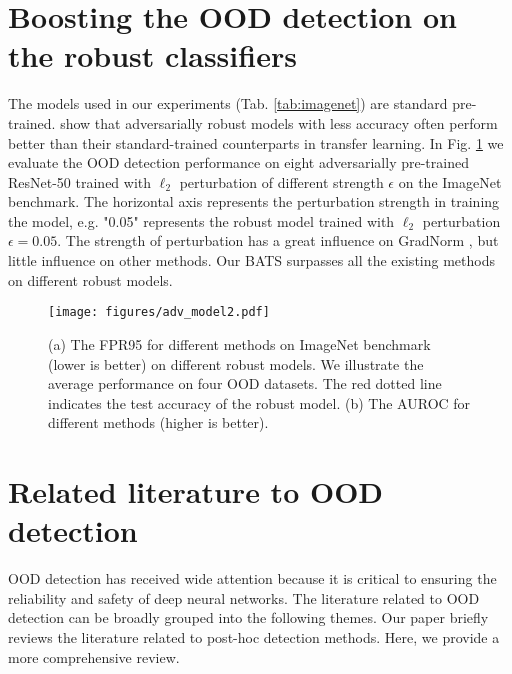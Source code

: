\documentclass{article}
\begin{document}
\section{Boosting the OOD detection on the robust classifiers}\label{App:Robust}
 The models used in our experiments (Tab. \ref{tab:imagenet}) are standard pre-trained. \citet{salman2020adversariallytrans} show that adversarially robust models with less accuracy often perform better than their standard-trained counterparts in transfer learning.
 In Fig. \ref{img:advmodel} we evaluate the OOD detection performance on eight adversarially pre-trained ResNet-50 trained with $\ell_{2}$ perturbation of different strength $\epsilon$ \cite{salman2020adversariallytrans} on the ImageNet benchmark. The horizontal axis represents the perturbation strength in training the model, e.g. "0.05" represents the robust model trained with $\ell_{2}$ perturbation $\epsilon=0.05$. The strength of perturbation has a great influence on GradNorm \cite{huang2021importance}, but little influence on other methods. Our BATS surpasses all the existing methods on different robust models.
 
 \begin{figure}[htbp]
\centering
\texttt{[image: figures/adv\_model2.pdf]}
\caption{(a) The FPR95 for different methods on ImageNet benchmark (lower is better) on different robust models. We illustrate the average performance on four OOD datasets. The red dotted line indicates the test accuracy of the robust model. (b) The AUROC for different methods (higher is better).}
\label{img:advmodel}
\end{figure}


\section{Related literature to OOD detection}\label{App:related}
OOD detection has received wide attention because it is critical to ensuring the reliability and safety of deep neural networks.
The literature related to OOD detection can be broadly grouped into the following themes. Our paper briefly reviews the literature related to post-hoc detection methods. Here, we provide a more comprehensive review. 
\end{document}
